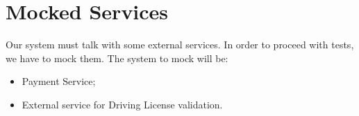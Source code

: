 \section{Mocked Services}
Our system must talk with some external services. In order to proceed with tests, we have to mock them. The system to mock will be:
\begin{itemize}
\item Payment Service;
\item External service for Driving License validation.
\end{itemize}